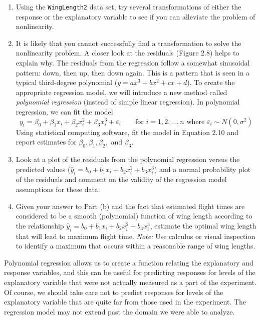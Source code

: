 \documentclass[
]{report}
\begin{document}
\begin{enumerate}
  \begin{enumerate}
    \item Using the \texttt{WingLength2} data set, try several transformations of either the response or the explanatory variable to see if you can alleviate the problem of nonlinearity.
      \item It is likely that you cannot successfully find a transformation to solve the nonlinearity problem. A closer look at the residuals (Figure 2.8) helps to explain why. The residuals from the regression follow a somewhat sinusoidal pattern: down, then up, then down again. This is a pattern that is seen in a typical third-degree polynomial ($\scriptstyle y = a x^3 + b x^2 + c x + d$). To create the appropriate regression model, we will introduce a new method called \textit{polynomial regression} (instead of simple linear regression). In polynomial regression, we can fit the model
      \[ \label{2.10}
        y_i = \beta_0 + \beta_1 x_i + \beta_2 x_i^2 + \beta_3 x_i^3 + \varepsilon_i \qquad \text{for } i = 1, 2, \ldots, n \text{ where } \varepsilon_i \sim N(0, \sigma^2)
        \tag{2.10}
      \]
      Using statistical computing software, fit the model in Equation 2.10 and report estimates for $\scriptstyle \beta_0, \beta_1, \beta_2,$ and $\scriptstyle \beta_3$.
      \item Look at a plot of the residuals from the polynomial regression versus the predicted values ($\scriptstyle \hat{y}_i = b_0 + b_1 x_i + b_2 x_i^2 + b_3 x_i^3$) and a normal probability plot of the residuals and comment on the validity of the regression model assumptions for these data.
      \item Given your answer to Part (b) and the fact that estimated flight times are considered to be a smooth (polynomial) function of wing length according to the relationship $\scriptstyle \hat{y}_i = b_0 + b_1 x_i + b_2 x_i^2 + b_3 x_i^3$, estimate the optimal wing length that will lead to maximum flight time. \textit{Note:} Use calculus or visual inspection to identify a maximum that occurs within a reasonable range of wing lengths.
    \end{enumerate}

Polynomial regression allows us to create a function relating the explanatory and response variables, and this can be useful for predicting responses for levels of the explanatory variable that were not actually measured as a part of the experiment. Of course, we should take care not to predict responses for levels of the explanatory variable that are quite far from those used in the experiment. The regression model may not extend past the domain we were able to analyze.

\end{enumerate}
\end{document}

